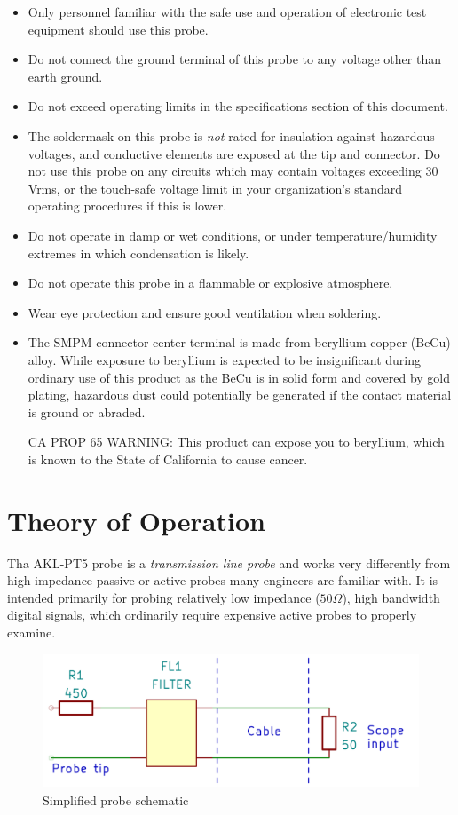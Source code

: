 \documentclass[11pt]{article}
\begin{document}
\begin{itemize}
\item Only personnel familiar with the safe use and operation of electronic test equipment should use this probe.
\item Do not connect the ground terminal of this probe to any voltage other than earth ground.
\item Do not exceed operating limits in the specifications section of this document.
\item The soldermask on this probe is \emph{not} rated for insulation against hazardous voltages, and conductive
elements are exposed at the tip and connector. Do not use this probe on any circuits which may contain voltages
exceeding 30 Vrms, or the touch-safe voltage limit in your organization's standard operating procedures if this is
lower.
\item Do not operate in damp or wet conditions, or under temperature/humidity extremes in which condensation is
likely.
\item Do not operate this probe in a flammable or explosive atmosphere.
\item Wear eye protection and ensure good ventilation when soldering.
\item The SMPM connector center terminal is made from beryllium copper (BeCu) alloy. While exposure to beryllium is
expected to be insignificant during ordinary use of this product as the BeCu is in solid form and covered by gold
plating, hazardous dust could potentially be generated if the contact material is ground or abraded.

CA PROP 65 WARNING: This product can expose you to beryllium, which is known to the State of California to cause cancer.
\end{itemize}

\pagebreak
\section{Theory of Operation}

Tha AKL-PT5 probe is a \emph{transmission line probe} and works very differently from high-impedance passive or active
probes many engineers are familiar with. It is intended primarily for probing relatively low impedance ($50 \Omega$),
high bandwidth digital signals, which ordinarily require expensive active probes to properly examine.

\begin{figure}[h]
\centering
\includegraphics[height=4cm]{schematic.png}
\caption{Simplified probe schematic}
\label{schematic}
\end{figure}
\end{document}
